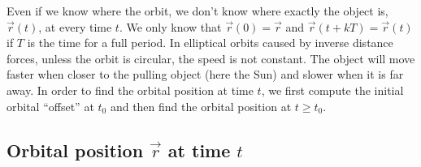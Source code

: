 \begin{appendices}
Even if we know where the orbit, we don't know where exactly the object is, $\vec{r}(t)$, at every time $t$. We only know that $\vec{r}(0) = \vec{r}$ and $\vec{r}(t+kT) = \vec{r}(t)$ if $T$ is the time for a full period. In elliptical orbits caused by inverse distance forces, unless the orbit is circular, the speed is not constant. The object will move faster when closer to the pulling object (here the Sun) and slower when it is far away. In order to find the orbital position at time $t$, we first compute the initial orbital ``offset'' at $t_0$ and then find the orbital position at $t \geq t_0$.

\subsection{Orbital position \texorpdfstring{$\vec{r}$}{r} at time \texorpdfstring{$t$}{t}}


\end{appendices}
